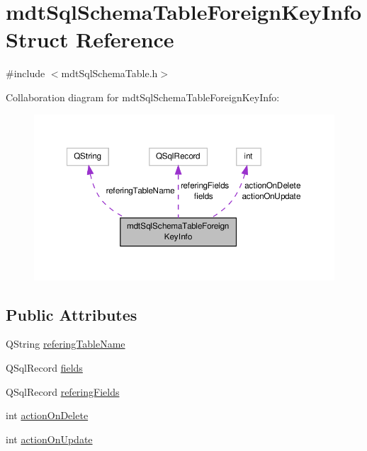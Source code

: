 \hypertarget{structmdt_sql_schema_table_foreign_key_info}{\section{mdt\-Sql\-Schema\-Table\-Foreign\-Key\-Info Struct Reference}
\label{structmdt_sql_schema_table_foreign_key_info}
}


{\ttfamily \#include $<$mdt\-Sql\-Schema\-Table.\-h$>$}



Collaboration diagram for mdt\-Sql\-Schema\-Table\-Foreign\-Key\-Info\-:\nopagebreak
\begin{figure}[H]
\begin{center}
\leavevmode
\includegraphics[width=350pt]{structmdt_sql_schema_table_foreign_key_info__coll__graph}
\end{center}
\end{figure}
\subsection*{Public Attributes}
\begin{DoxyCompactItemize}
\item 
Q\-String \hyperlink{structmdt_sql_schema_table_foreign_key_info_a67a54a858ca960ed0da71f734bb222b1}{refering\-Table\-Name}
\item 
Q\-Sql\-Record \hyperlink{structmdt_sql_schema_table_foreign_key_info_a889196c9a4cb8c89722de9f03fa6daae}{fields}
\item 
Q\-Sql\-Record \hyperlink{structmdt_sql_schema_table_foreign_key_info_a23be89174f7131ce33047b11da180504}{refering\-Fields}
\item 
int \hyperlink{structmdt_sql_schema_table_foreign_key_info_a0c653ac4f2e5fdfe9dce56bfb4f09ee5}{action\-On\-Delete}
\item 
int \hyperlink{structmdt_sql_schema_table_foreign_key_info_ae43338084ff992252607f38078053475}{action\-On\-Update}
\end{DoxyCompactItemize}


